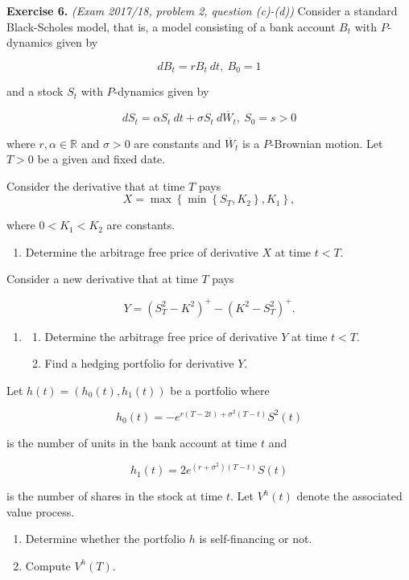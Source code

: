 \documentclass[
]{article}
\providecommand{\tightlist}{%
  \setlength{\itemsep}{0pt}\setlength{\parskip}{0pt}}
\begin{document}
\textbf{Exercise 6.} \emph{(Exam 2017/18, problem 2, question (c)-(d))}
Consider a standard Black-Scholes model, that is, a model consisting of
a bank account \(B_t\) with \(P\)-dynamics given by

\[
dB_t=rB_t\ dt,\ B_0=1
\]

and a stock \(S_t\) with \(P\)-dynamics given by

\[
dS_t=\alpha S_t\ dt+\sigma S_t\ d\overline{W}_t,\ S_0=s>0
\]

where \(r,\alpha\in\mathbb{R}\) and \(\sigma >0\) are constants and
\(\overline{W}_t\) is a \(P\)-Brownian motion. Let \(T>0\) be a given
and fixed date.

Consider the derivative that at time \(T\) pays \[
X=\max\left\{\min\left\{S_T,K_2\right\},K_1\right\},
\]

where \(0<K_1<K_2\) are constants.

\begin{enumerate}
\def\labelenumi{\alph{enumi}.}
\tightlist
\item
  Determine the arbitrage free price of derivative \(X\) at time
  \(t<T\).
\end{enumerate}

Consider a new derivative that at time \(T\) pays

\[
Y=(S^2_T-K^2)^+-(K^2-S^2_T)^+.
\]

\begin{enumerate}
\def\labelenumi{\alph{enumi}.}
\setcounter{enumi}{1}
\item
  \begin{enumerate}
  \def\labelenumii{\roman{enumii}.}
  \tightlist
  \item
    Determine the arbitrage free price of derivative \(Y\) at time
    \(t<T\).
  \item
    Find a hedging portfolio for derivative \(Y\).
  \end{enumerate}
\end{enumerate}

Let \(h(t)=(h_0(t),h_1(t))\) be a portfolio where

\[
h_0(t)=-e^{r(T-2t)+\sigma^2(T-t)}S^2(t)
\]

is the number of units in the bank account at time \(t\) and

\[
h_1(t)=2e^{(r+\sigma^2)(T-t)}S(t)
\]

is the number of shares in the stock at time \(t\). Let \(V^h(t)\)
denote the associated value process.

\begin{enumerate}
\def\labelenumi{\alph{enumi}.}
\setcounter{enumi}{2}
\tightlist
\item
  Determine whether the portfolio \(h\) is self-financing or not.
\item
  Compute \(V^h(T)\).
\end{enumerate}
\end{document}
